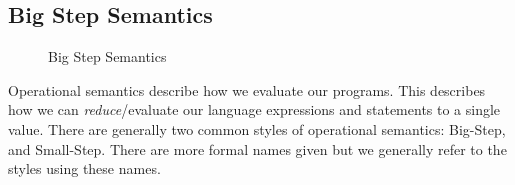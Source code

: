 \subsection{Big Step Semantics}
\label{subsec:semantics}

\begin{figure}[ht]
  \centering
{}
  \caption{\label{fig:semantics}Big Step Semantics}
\end{figure}

Operational semantics describe how we evaluate our programs.
This describes how we can \emph{reduce}/evaluate our language expressions and statements to a single value.
There are generally two common styles of operational semantics: Big-Step, and Small-Step.
There are more formal names given but we generally refer to the styles using these names.

